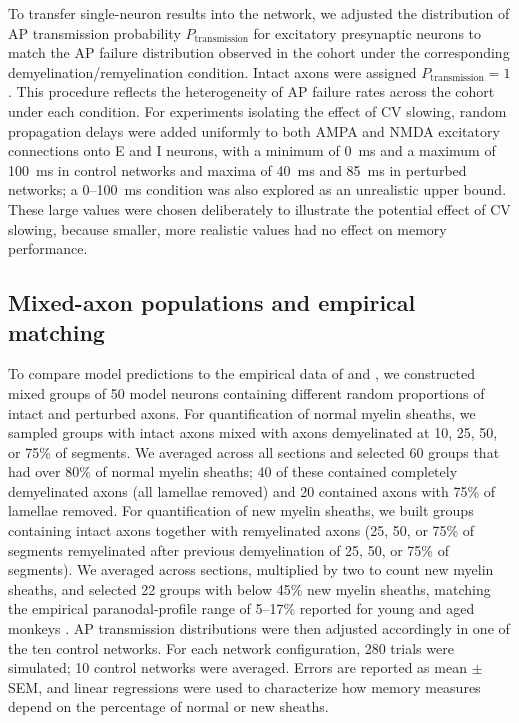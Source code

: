 \documentclass[11pt]{article}
\begin{document}
To transfer single-neuron results into the network, we adjusted the distribution of AP transmission probability $P_{\mathrm{transmission}}$ for excitatory presynaptic neurons to match the AP failure distribution observed in the cohort under the corresponding demyelination/remyelination condition. Intact axons were assigned $P_{\mathrm{transmission}} = 1$. This procedure reflects the heterogeneity of AP failure rates across the cohort under each condition. For experiments isolating the effect of CV slowing, random propagation delays were added uniformly to both AMPA and NMDA excitatory connections onto E and I neurons, with a minimum of 0~ms and a maximum of 100~ms in control networks and maxima of 40~ms and 85~ms in perturbed networks; a 0--100~ms condition was also explored as an unrealistic upper bound. These large values were chosen deliberately to illustrate the potential effect of CV slowing, because smaller, more realistic values had no effect on memory performance.

\subsection{Mixed-axon populations and empirical matching}

To compare model predictions to the empirical data of \citet{peters2002aging} and \citet{peters2003remyelination}, we constructed mixed groups of 50 model neurons containing different random proportions of intact and perturbed axons. For quantification of normal myelin sheaths, we sampled groups with intact axons mixed with axons demyelinated at 10, 25, 50, or 75\% of segments. We averaged across all sections and selected 60 groups that had over 80\% of normal myelin sheaths; 40 of these contained completely demyelinated axons (all lamellae removed) and 20 contained axons with 75\% of lamellae removed. For quantification of new myelin sheaths, we built groups containing intact axons together with remyelinated axons (25, 50, or 75\% of segments remyelinated after previous demyelination of 25, 50, or 75\% of segments). We averaged across sections, multiplied by two to count new myelin sheaths, and selected 22 groups with below 45\% new myelin sheaths, matching the empirical paranodal-profile range of 5--17\% reported for young and aged monkeys \citep{peters2003remyelination}. AP transmission distributions were then adjusted accordingly in one of the ten control networks. For each network configuration, 280 trials were simulated; 10 control networks were averaged. Errors are reported as mean $\pm$ SEM, and linear regressions were used to characterize how memory measures depend on the percentage of normal or new sheaths.
\end{document}
